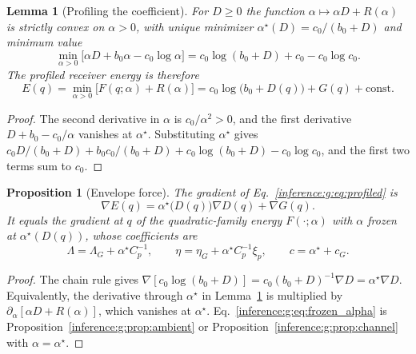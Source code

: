 \documentclass[11pt]{article}
\newtheorem{proposition}[theorem]{Proposition}
\newtheorem{lemma}[theorem]{Lemma}
\theoremstyle{definition}
\theoremstyle{remark}
\begin{document}
\begin{lemma}[Profiling the coefficient]
\label{inference:g:lem:profile}
For $D\ge0$ the function $\alpha\mapsto\alpha D+R(\alpha)$ is strictly convex on $\alpha>0$, with unique minimizer $\alpha^\star(D)=c_0/(b_0+D)$ and minimum value
\begin{equation}
\min_{\alpha>0}\bigl[\alpha D+b_0\alpha-c_0\log\alpha\bigr]=c_0\log(b_0+D)+c_0-c_0\log c_0.
\end{equation}
The profiled receiver energy is therefore
\begin{equation}
E(q)=\min_{\alpha>0}\bigl[F(q;\alpha)+R(\alpha)\bigr]=c_0\log\bigl(b_0+D(q)\bigr)+G(q)+\text{const}.
\label{inference:g:eq:profiled}
\end{equation}
\end{lemma}

\begin{proof}
The second derivative in $\alpha$ is $c_0/\alpha^2>0$, and the first derivative $D+b_0-c_0/\alpha$ vanishes at $\alpha^\star$. Substituting $\alpha^\star$ gives $c_0D/(b_0+D)+b_0c_0/(b_0+D)+c_0\log(b_0+D)-c_0\log c_0$, and the first two terms sum to $c_0$.
\end{proof}

\begin{proposition}[Envelope force]
\label{inference:g:prop:envelope}
The gradient of Eq.~\eqref{inference:g:eq:profiled} is
\begin{equation}
\nabla E(q)=\alpha^\star\bigl(D(q)\bigr)\nabla D(q)+\nabla G(q).
\end{equation}
It equals the gradient at $q$ of the quadratic-family energy $F(\cdot;\alpha)$ with $\alpha$ frozen at $\alpha^\star(D(q))$, whose coefficients are
\begin{equation}
\Lambda=\Lambda_G+\alpha^\star C_p^{-1},\qquad \eta=\eta_G+\alpha^\star C_p^{-1}\xi_p,\qquad c=\alpha^\star+c_G.
\label{inference:g:eq:frozen_alpha}
\end{equation}
\end{proposition}

\begin{proof}
The chain rule gives $\nabla[c_0\log(b_0+D)]=c_0(b_0+D)^{-1}\nabla D=\alpha^\star\nabla D$. Equivalently, the derivative through $\alpha^\star$ in Lemma~\ref{inference:g:lem:profile} is multiplied by $\partial_\alpha[\alpha D+R(\alpha)]$, which vanishes at $\alpha^\star$. Eq.~\eqref{inference:g:eq:frozen_alpha} is Proposition~\ref{inference:g:prop:ambient} or Proposition~\ref{inference:g:prop:channel} with $\alpha=\alpha^\star$.
\end{proof}
\end{document}
